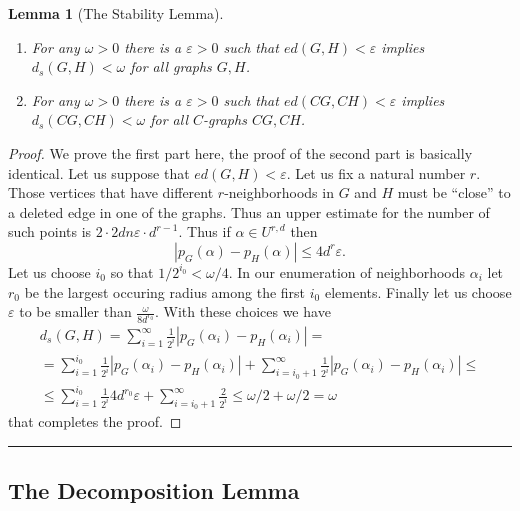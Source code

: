 \documentclass{article}
\newtheorem{lemma}{Lemma}[section]
\newcommand{\ep}{\varepsilon}
\newcommand{\qed} {\hspace {0.1in} \rule {1.5mm} {3.5mm}}
\begin{document}
\begin{lemma}[The Stability Lemma]~\label{distancelem} {\ }
\begin{enumerate}
\item
For any $\omega > 0$ there is a $\ep > 0$ such that $ed(G,H) < \ep$
implies $d_s(G,H) < \omega$ for all graphs $G,H$.
\item 
For any $\omega > 0$ there is a $\ep > 0$ such that $ed(CG,CH) < \ep$
implies $d_s(CG,CH) < \omega$ for all $C$-graphs $CG,CH$.
\end{enumerate}
\end{lemma}

\begin{proof} We prove the first part here, the proof of the second
  part is basically identical.  Let us suppose that $ed(G,H) <\ep$. Let us fix
a natural number $r$. 
Those vertices that have different $r$-neighborhoods in $G$ and
$H$ must be ``close'' to a deleted edge in one of the graphs. Thus an
upper estimate for the number of such points is
$2\cdot 2dn\ep\cdot d^{r-1}$. Thus if $\alpha \in U^{r,d}$ then
\[|p_G(\alpha) - p_H(\alpha)| \leq 4d^r\ep.\]
Let us choose $i_0$ so that $1/2^{i_0} < \omega/4$. In our enumeration of
neighborhoods $\alpha_i$ let $r_0$ be the largest occuring radius
among the first $i_0$ elements. Finally let us choose $\ep$ to be
smaller than $\frac{\omega}{8 d^{r_0}}$.
With these choices we have
\begin{multline}
d_s(G,H) =  \sum_{i=1}^{\infty}
  \frac{1}{2^i}|p_G(\alpha_i)-p_H(\alpha_i)| = \\
= \sum_{i=1}^{i_0}
  \frac{1}{2^i}|p_G(\alpha_i)-p_H(\alpha_i)| + \sum_{i=i_0+1}^{\infty}
  \frac{1}{2^i}|p_G(\alpha_i)-p_H(\alpha_i)| \leq \\
\leq \sum_{i=1}^{i_0}
  \frac{1}{2^i}4d^{r_0}\ep +
  \sum_{i=i_0+1}^{\infty}\frac{2}{2^i} \leq \omega/2 + \omega/2 = \omega
\end{multline}
 that completes the proof.
\end{proof} \qed


\subsection{The Decomposition Lemma}~\label{splittingsec}
\end{document}
